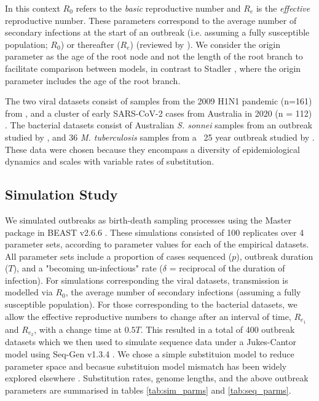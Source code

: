 \documentclass{article}
\begin{document}
\begin{spacing}{1.5}
In this context $R_0$ refers to the \textit{basic} reproductive number and $R_e$ is the \textit{effective} reproductive number. These parameters correspond to the average number of secondary infections at the start of an outbreak (i.e. assuming a fully susceptible population; $R_0$) or thereafter ($R_e$) (reviewed by \citep{featherstone2022epidemiological, du2015getting, kuhnert2011phylogenetic}). We consider the origin parameter as the age of the root node and not the length of the root branch to facilitate comparison between models, in contrast to Stadler \citet{stadler2012estimating}, where the origin parameter includes the age of the root branch.

The two viral datasets consist of samples from the 2009 H1N1 pandemic (n=161) from \citet{hedge_2013_real-time}, and a cluster of early SARS-CoV-2 cases from  Australia in 2020 (n = 112) \citep{lane2021genomics}. The bacterial datasets consist of Australian \textit{S. sonnei} samples from an outbreak studied by \citet{ingle_co-circulation_2019}, and 36 \textit{M. tuberculosis} samples from a ~25 year outbreak studied by \citet{kuhnert_tuberculosis_2018}. These data were chosen because they encompass a diversity of epidemiological dynamics and scales with variable rates of substitution.

\subsection*{Simulation Study}
We simulated outbreaks as birth-death sampling processes using the Master package in BEAST v2.6.6 \citep{vaughan_stochastic_2013,bouckaert_beast_2019}. These simulations consisted of 100 replicates over 4 parameter sets, according to parameter values for each of the empirical datasets. All parameter sets include a proportion of cases sequenced ($p$), outbreak duration ($T$), and a "becoming un-infectious" rate ($\delta$ = reciprocal of the duration of infection). For simulations corresponding the viral datasets, transmission is modelled via $R_0$, the average number of secondary infections (assuming a fully susceptible population). For those corresponding to the bacterial datasets, we allow the effective reproductive numbers to change after an interval of time, $R_{e_1}$ and $R_{e_2}$, with a change time at $0.5T$. This resulted in a total of 400 outbreak datasets which we then used to simulate sequence data under a Jukes-Cantor model using Seq-Gen v1.3.4 \citep{rambaut_seq-gen_1997}. We chose a simple substituion model to reduce parameter space and becasue substituion model mismatch has been widely explored elsewhere \citep{lemmon2004importance}. Substitution rates, genome lengths, and the above outbreak parameters are summarised in tables \ref{tab:sim_parms} and \ref{tab:seq_parms}.


\end{spacing}
\end{document}
